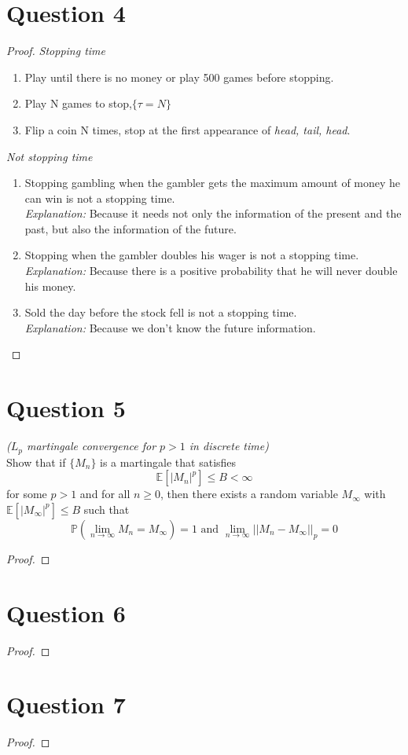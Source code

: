 \documentclass{article}
\begin{document}
\section*{Question 4}
    \begin{proof}
        \indent
        \textit{Stopping time}
        \begin{enumerate}
            \item Play until there is no money or play 500 games before stopping.
            \item Play N games to stop,$\{\tau=N\}$
            \item Flip a coin N times, stop at the first appearance of \textit{head, tail, head}.
        \end{enumerate}
        \textit{Not stopping time}
        \begin{enumerate}
            \item Stopping gambling when the gambler gets the maximum amount of money he can win is not a stopping time.\\
            \textit{Explanation:} Because it needs not only the information of the present and the past, but also the information of the future.
            \item Stopping when the gambler doubles his wager is not a stopping time.\\
            \textit{Explanation:} Because there is a positive probability that he will never double his money.
            \item Sold the day before the stock fell is not a stopping time.\\
            \textit{Explanation:} Because we don’t know the future information.
        \end{enumerate}
    \end{proof}

\section*{Question 5}
    
    \textit{($L_p$ martingale convergence for $p>1$ in discrete time)}\\
    Show that if $\{M_n\}$ is a martingale that satisfies
    $$\mathbb{E}\left[\left|M_n\right|^p\right] \leqslant B < \infty$$
    for some $p>1$ and for all $n\geqslant 0$, then there exists a random variable $M_\infty$ with $\mathbb{E}\left[\left| M_\infty\right|^p\right]\leqslant B$ such that
    $$\mathbb{P}\left(\lim_{n\to \infty}M_n = M_\infty\right)=1 \text{ and } \lim_{n\to \infty}||M_n-M_\infty||_p=0$$
    \begin{proof}
        
    \end{proof}

\section*{Question 6}
    \begin{proof}

    \end{proof}

\section*{Question 7}
    \begin{proof}

    \end{proof}
\end{document}
